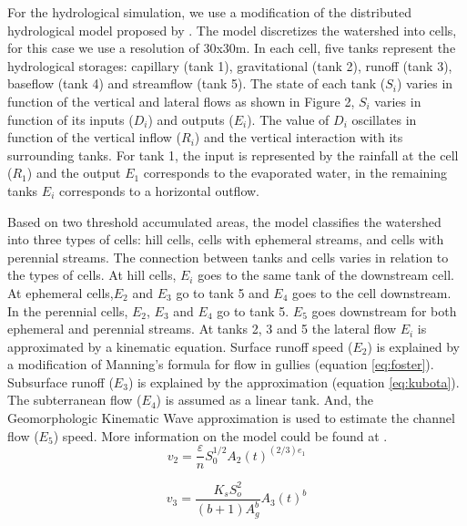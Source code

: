 \documentclass[preprint,12pt]{elsarticle}
\begin{document}
For the hydrological simulation, we use a modification of the distributed hydrological model proposed by \citep{Frances2007, Velez2001}.  The model discretizes the watershed into cells, for this case we use a resolution of 30x30m.   In each cell, five tanks represent the hydrological storages: capillary (tank 1), gravitational (tank 2), runoff (tank 3), baseflow (tank 4) and streamflow  (tank 5).  The state of each tank ($S_i$) varies in function of the vertical and lateral flows as shown in Figure 2,  $S_i$ varies in function of its inputs ($D_i$) and outputs ($E_i$). The value of $D_i$ oscillates in function of the vertical inflow ($R_i$) and the vertical interaction with its surrounding tanks.  For tank 1, the input is represented by the rainfall at the cell ($R_1$) and the output $E_1$ corresponds to the evaporated water, in the remaining tanks $E_i$ corresponds to a horizontal outflow. 

Based on two threshold accumulated areas, the model classifies the watershed into three types of cells: hill cells, cells with ephemeral streams, and cells with perennial streams.  The connection between tanks and cells varies in relation to the types of cells.  At hill cells, $E_i$ goes to the same tank of the downstream cell.  At ephemeral cells,$E_2$ and $E_3$ go to tank 5 and $E_4$ goes to the cell downstream. In the perennial cells, $E_2$, $E_3$ and $E_4$ go to tank 5.  $E_5$ goes downstream for both ephemeral and perennial streams.  At tanks 2, 3 and 5 the lateral flow $E_i$ is approximated by a kinematic equation.  Surface runoff speed ($E_2$) is explained by a modification of Manning's formula for flow in gullies \citep{Foster1984} (equation \ref{eq:foster}).  Subsurface runoff ($E_3$) is explained by the \citep{Kubota1995} approximation (equation \ref{eq:kubota}).  The subterranean flow ($E_4$) is assumed as a linear tank. And, the Geomorphologic Kinematic Wave approximation \citep{Velez2001} is used to estimate the channel flow ($E_5$) speed.  More information on the model could be found at \citep{Velez2001, Frances2007}. \\

\begin{equation}
 v_{2} = \frac{\varepsilon}{n}  S_{0}^{1/2} A_{2}(t)^{(2/3) e_1}
    \label{eq:foster}
\end{equation}

\begin{equation}
 v_3 = \frac{K_s S_{o}^{2}}{(b+1) A_{g}^{b}} A_{3}(t)^{b}
    \label{eq:kubota}
\end{equation}
\end{document}
